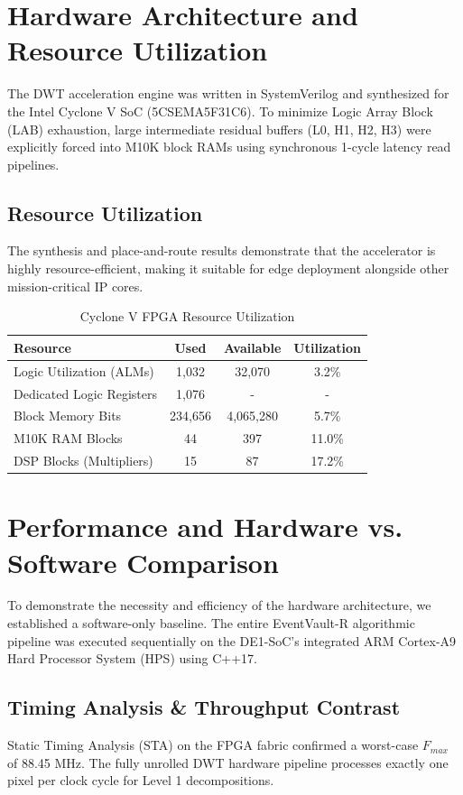 \documentclass[journal]{IEEEtran}
\begin{document}
\section{Hardware Architecture and Resource Utilization}
The DWT acceleration engine was written in SystemVerilog and synthesized for the Intel Cyclone V SoC (5CSEMA5F31C6). To minimize Logic Array Block (LAB) exhaustion, large intermediate residual buffers (L0, H1, H2, H3) were explicitly forced into M10K block RAMs using synchronous 1-cycle latency read pipelines.

\subsection{Resource Utilization}
The synthesis and place-and-route results demonstrate that the accelerator is highly resource-efficient, making it suitable for edge deployment alongside other mission-critical IP cores.

\begin{table}[ht]
\centering
\caption{Cyclone V FPGA Resource Utilization}
\label{tab:utilization}
\begin{tabular}{@{}lccc@{}}
\toprule
\textbf{Resource} & \textbf{Used} & \textbf{Available} & \textbf{Utilization} \\ \midrule
Logic Utilization (ALMs) & 1,032 & 32,070 & 3.2\% \\
Dedicated Logic Registers & 1,076 & - & - \\
Block Memory Bits & 234,656 & 4,065,280 & 5.7\% \\
M10K RAM Blocks & 44 & 397 & 11.0\% \\
DSP Blocks (Multipliers) & 15 & 87 & 17.2\% \\ \bottomrule
\end{tabular}
\end{table}

\section{Performance and Hardware vs. Software Comparison}
To demonstrate the necessity and efficiency of the hardware architecture, we established a software-only baseline. The entire EventVault-R algorithmic pipeline was executed sequentially on the DE1-SoC's integrated ARM Cortex-A9 Hard Processor System (HPS) using C++17. 

\subsection{Timing Analysis \& Throughput Contrast}
Static Timing Analysis (STA) on the FPGA fabric confirmed a worst-case $F_{max}$ of 88.45 MHz. The fully unrolled DWT hardware pipeline processes exactly one pixel per clock cycle for Level 1 decompositions.
\end{document}
